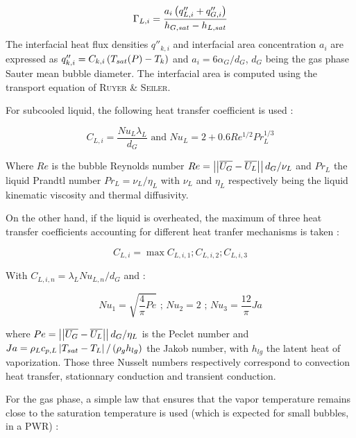 \begin{equation}
\label{eq:condensation_rate}
\Gamma_{L,i}=\frac{a_{i}\left( q''_{L,i}+q''_{G,i} \right)}{h_{G,sat}-h_{L,sat}}
\end{equation}
The interfacial heat flux densities $q''_{k,i}$ and interfacial area concentration $a_{i}$ are expressed as $q''_{k,i}=C_{k,i}\left( T_{sat}(P)-T_{k} \right)$ and $a_{i}=6 \alpha_{G}/d_{G}$, $d_{G}$ being the gas phase Sauter mean bubble diameter. The interfacial area is computed using the transport equation of \textsc{Ruyer} \& \textsc{Seiler}\cite{Ruyer2009}.

For subcooled liquid, the following heat transfer coefficient is used \cite{Manon2000}:

\begin{equation}
\label{eq:subcooled_HT}
C_{L,i}=\frac{Nu_{L}\lambda_{L}}{d_{G}} \text{ and } Nu_{L}=2+0.6Re^{1/2}Pr_{L}^{1/3}
\end{equation}

Where $Re$ is the bubble Reynolds number $Re=\left|\left|{\overline{U_{G}}-\overline{U_{L}}}\right|\right|d_{G}/\nu_{L}$ and $Pr_{L}$ the liquid Prandtl number $Pr_{L}=\nu_{L}/\eta_{L}$ with $\nu_{L}$ and $\eta_{L}$ respectively being the liquid kinematic viscosity and thermal diffusivity.

On the other hand, if the liquid is overheated, the maximum of three heat transfer coefficients accounting for different heat tranfer mechanisms is taken \cite{Berne1983}:

\begin{equation}
\label{eq:superheated_HT}
C_{L,i}=\max{C_{L,i,1} ; C_{L,i,2} ; C_{L,i,3}}
\end{equation}

With $C_{L,i,n}=\lambda_{L}Nu_{L,n}/d_{G}$ and :

\begin{equation}
\label{eq:nusselt}
Nu_{1}=\sqrt{\frac{4}{\pi}Pe}\text { ; } Nu_{2}=2 \text{ ; } Nu_{3}=\frac{12}{\pi} Ja
\end{equation}


where $Pe=\left|\left|{ \overline{U_{G}}-\overline{U_{L}} }\right|\right|d_{G}/\eta_{L}$ is the Peclet number and $Ja=\rho_{L}c_{p,L}\left| T_{sat}-T_{L} \right|/\left( \rho_{g} h_{lg} \right)$ the Jakob number, with $h_{lg}$ the latent heat of vaporization. Those three Nusselt numbers respectively correspond to convection heat transfer, stationnary conduction and transient conduction.


For the gas phase, a simple law that ensures that the vapor temperature remains close to the saturation temperature is used (which is expected for small bubbles, \eg in a PWR) :

